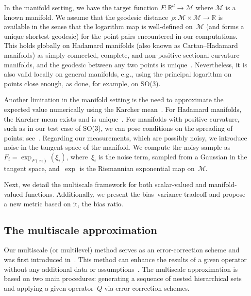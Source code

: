 \documentclass[12pt]{article}
\newcommand{\R}{\mathbb{R}}
\newcommand{\M}{\mathcal{M}}
\begin{document}
In the manifold setting,  we have the target function $F \colon \R^d \to \M$ where $\M$ is a known manifold. We assume that the geodesic distance~$\rho:\M \times \M \to \R$ is available in the sense that the logarithm map is well-defined on~$\M$ (and forms a unique shortest geodesic) for the point pairs encountered in our computations. This holds globally on Hadamard manifolds (also known as Cartan--Hadamard manifolds) as simply connected, complete, and non-positive sectional curvature manifolds, and the geodesic between any two points is unique~\cite{li2012geometric}. Nevertheless, it is also valid locally on general manifolds, e.g., using the principal logarithm on points close enough, as done, for example, on SO(3).

Another limitation in the manifold setting is the need to approximate the expected value numerically using the Karcher mean~\cite{karcher1977riemannian}. For Hadamard manifolds, the Karcher mean exists and is unique~\cite{huning2019convergence, sander2016geodesic}. For manifolds with positive curvature, such as in our test case of SO(3), we can pose conditions on the spreading of points; see~\cite{dyer2016barycentric, huning2022convergence}. Regarding our measurements, which are possibly noisy, we introduce noise in the tangent space of the manifold. We compute the noisy sample as~$F_i = \exp_{F(x_i)}(\xi_i)$, where~$\xi_i$ is the noise term, sampled from a Gaussian in the tangent space, and~$\exp$ is the Riemannian exponential map on~$\M$.

Next, we detail the multiscale framework for both scalar-valued and manifold-valued functions. Additionally, we present the bias--variance tradeoff and propose a new metric based on it, the bias ratio.

\subsection{The multiscale approximation}

Our multiscale (or multilevel) method serves as an error-correction scheme and was first introduced in~\cite{floater1996multistep}. This method can enhance the results of a given operator without any additional data or assumptions~\cite{sharon2022multiscale, wendland2010multiscale, franz2023multilevel, le2020multilevel, bermanis2013multiscale, chiavazzo2014reduced}. The multiscale approximation is based on two main procedures: generating a sequence of nested hierarchical sets and applying a given operator~$Q$ via error-correction schemes.
\end{document}
